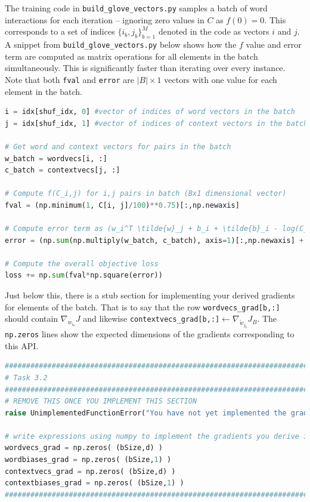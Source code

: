 \documentclass[a4paper,10pt]{article}
\begin{document}
The training code in \texttt{build\_glove\_vectors.py} samples a batch of word interactions for each iteration -- ignoring zero values in $C$ as $f(0) = 0$. This corresponds to a set of indices $\{i_b,j_b\}_{b=1}^M$ denoted in the code as vectors $i$ and $j$. A snippet from \texttt{build\_glove\_vectors.py} below shows how the $f$ value and error term are computed as matrix operations for all elements in the batch simultaneously. This is significantly faster than iterating over every instance. Note that both \texttt{fval} and \texttt{error} are $|B|\times1$ vectors with one value for each element in the batch.
%
\begin{center}
\begin{minipage}{0.95\textwidth}
\begin{lstlisting}[language=Python]
i = idx[shuf_idx, 0] #vector of indices of word vectors in the batch
j = idx[shuf_idx, 1] #vector of indices of context vectors in the batch

# Get word and context vectors for pairs in the batch
w_batch = wordvecs[i, :] 
c_batch = contextvecs[j, :] 

# Compute f(C_i,j) for i,j pairs in batch (Bx1 dimensional vector)
fval = (np.minimum(1, C[i, j]/100)**0.75)[:,np.newaxis]

# Compute error term as (w_i^T \tilde{w}_j + b_i + \tilde{b}_i - log(C_ij)) for each i,j pair in the batch. (Bx1 dimensional vector)
error = (np.sum(np.multiply(w_batch, c_batch), axis=1)[:,np.newaxis] + wordbiases[i] + contextbiases[j] - np.log(C[i,j])[:,np.newaxis])

# Compute the overall objective loss
loss += np.sum(fval*np.square(error))
\end{lstlisting}
\end{minipage}
\end{center}
%
Just below this, there is a stub section for implementing your derived gradients for elements of the batch. That is to say that the row 
\texttt{wordvecs\_grad[b,:]} should contain $\nabla_{w_{i_b}} J$ and likewise \texttt{contextvecs\_grad[b,:]}$\leftarrow \nabla_{\tilde{w}_{j_b}} J_B$. The \texttt{np.zeros} lines show the expected dimensions of the gradients corresponding to this API.
%
\begin{center}
\begin{minipage}{0.95\textwidth}
\begin{lstlisting}[language=Python]
########################################################################
# Task 3.2
########################################################################
# REMOVE THIS ONCE YOU IMPLEMENT THIS SECTION
raise UnimplementedFunctionError("You have not yet implemented the gradient computation.")

# write expressions using numpy to implement the gradients you derive in 3.1.
wordvecs_grad = np.zeros( (bSize,d) )
wordbiases_grad = np.zeros( (bSize,1) )
contextvecs_grad = np.zeros( (bSize,d) )
contextbiases_grad = np.zeros( (bSize,1) )
########################################################################
\end{lstlisting}
\end{minipage}
\end{center}
\end{document}
